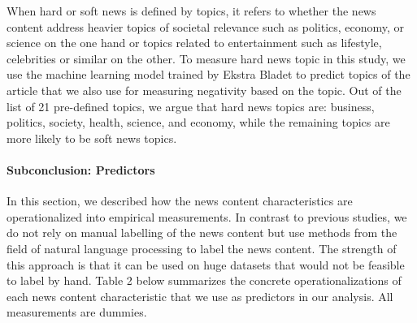 \documentclass[
]{article}
\begin{document}
When hard or soft news is defined by topics, it refers to whether the
news content address heavier topics of societal relevance such as
politics, economy, or science on the one hand or topics related to
entertainment such as lifestyle, celebrities or similar on the other. To
measure hard news topic in this study, we use the machine learning model
trained by Ekstra Bladet to predict topics of the article that we also
use for measuring negativity based on the topic. Out of the list of 21
pre-defined topics, we argue that hard news topics are: business,
politics, society, health, science, and economy, while the remaining
topics are more likely to be soft news topics.

\hypertarget{subconclusion-predictors}{%
\paragraph*{Subconclusion: Predictors}\label{subconclusion-predictors}}

\hspace{-2.5em}

\noindent In this section, we described how the news content
characteristics are operationalized into empirical measurements. In
contrast to previous studies, we do not rely on manual labelling of the
news content but use methods from the field of natural language
processing to label the news content. The strength of this approach is
that it can be used on huge datasets that would not be feasible to label
by hand. Table 2 below summarizes the concrete operationalizations of
each news content characteristic that we use as predictors in our
analysis. All measurements are dummies.
\end{document}
